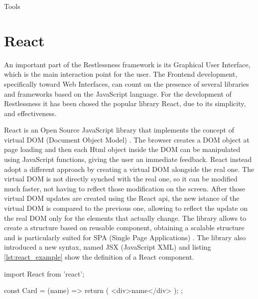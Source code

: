 \begin{chapter}{Tools}
    \section{React}
    An important part of the Restlessness framework is its Graphical User Interface,
    which is the main interaction point for the user. The Frontend development,
    specifically toward Web Interfaces, can count on the presence of several
    libraries and frameworks based on the JavaScript language. For the development
    of Restlessness it has been chosed the popular library React, due to its simplicity,
    and effectiveness.

    React is an Open Source JavaScript library that implements the concept of
    virtual DOM (Document Object Model) \cite{dom_standard}. The browser creates
    a DOM object at page loading and then each Html object inside the DOM can be
    manipulated using JavaScript functions, giving the user an immediate feedback.
    React instead adopt a different approach by creating a virtual DOM alongside
    the real one. The virtual DOM is not directly synched with the real one, so
    it can be modified much faster, not having to reflect those modification on
    the screen. After those virtual DOM updates are created using the React api,
    the new istance of the virtual DOM is compared to the previous one, allowing
    to reflect the update on the real DOM only for the elements that actually
    change. The library allows to create a structure based on reusable component,
    obtaining a scalable structure and is particularly suited for SPA (Single
    Page Applications) \cite{react_js}.
    The library also introduced a new syntax, named JSX (JavaScript XML) and
    listing \ref{lst:react_example} show the definition of a React component.

    \bigskip
    \begin{code}[caption= React component definition,label={lst:react_example}]
import React from 'react';

const Card = ({name}) => {
  return (
      <div>{name}</div>
  );
};
    \end{code}

\end{chapter}